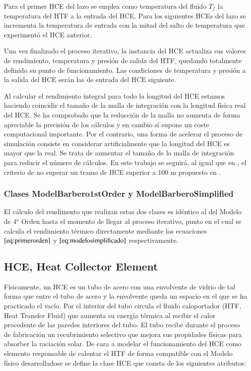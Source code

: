 Para el primer HCE del lazo se emplea como temperatura del fluido \(T_f\) la temperatura del HTF a la entrada del HCE. Para los siguientes HCEs del lazo se incrementa la temperatura de entrada con la mitad del salto de temperatura que experimentó el HCE anterior.

Una vez finalizado el proceso iterativo, la instancia del HCE actualiza sus valores de rendimiento, temperatura y presión de salida del HTF, quedando totalmente definido su punto de funcionamiento. Las condiciones de temperatura y presión a la salida del HCE serán las de entrada del HCE siguiente.

Al calcular el rendimiento integral para todo la longitud del HCE estamos haciendo coincidir el tamaño de la malla de integración con la longitud física real del HCE. Se ha comprobado que la reducción de la malla no aumenta de forma apreciable la precisión de los cálculos y en cambio sí supone un coste computacional importante. Por el contrario, una forma de acelerar el proceso de simulación consiste en considerar artificialmente que la longitud del HCE es mayor que la real. Se trata de aumentar el tamaño de la malla de integración para reducir el número de cálculos. En este trabajo se seguirá, al igual que en \cite{1022085/7TD8VTGL}, el criterio de no superar un tramo de HCE superior a 100 m propuesto en \cite{1022085/CYH3NJEG}. 

\subsubsection{Clases ModelBarbero1stOrder  y ModelBarberoSimplified}

El cálculo del rendimento que realizan estas dos clases es idéntico al del Modelo de 4$^o$  Orden hasta el momento de llegar al proceso iterativo, punto en el cual se calcula el rendimiento térmico directamente mediante las ecuaciones  \(\eqref{eq:primerorden}\) y \(\eqref{eq:modelosimplificado}\) respectivamente.

\subsection{HCE, Heat Collector Element}
\label{heat-collector-element-hce}

Físicamente, un HCE es un tubo de acero con una envolvente de vidrio de tal forma que entre el tubo de acero y la envolvente queda un espacio en el que se ha practicado el vacío. Por el interior del tubo circula el fluido caloportador (HTF, Heat Transfer Fluid) que aumenta su energía térmica al recibir el calor procedente de las paredes interiores del tubo. El tubo recibe durante el proceso de fabricación un recubrimiento selectivo que mejora sus propidades físicas para absorber la raciación solar. De cara a modelar el funcionamiento del HCE como elemento responsable de calentar el HTF de forma compatible con el Modelo físico desarrolladose se define la clase HCE que consta de los siguientes atributos:

